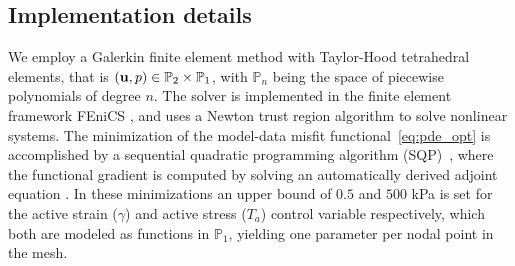\subsection{Implementation details}
We employ a Galerkin finite element method with Taylor-Hood
tetrahedral elements, that is $(\mathbf{u}, p) \in \mathbb{P}_2 \times
\mathbb{P}_1 $, with $\mathbb{P}_n$ being the space of piecewise
polynomials of degree $n$.
The solver is implemented in the finite element framework FEniCS
\cite{logg2012automated}, and uses a Newton trust region algorithm
\cite{PETScPackage} to solve nonlinear systems. The minimization of the
model-data misfit functional~\eqref{eq:pde_opt} is accomplished by a sequential
quadratic programming algorithm (SQP)~\cite{kraft1988software}, where
the functional gradient is computed by solving an automatically derived adjoint
equation \cite{farrell2013automated}. In these minimizations an upper
bound of $0.5$ and $500$ kPa is set for the active strain ($\gamma$)
and active stress ($T_a$) control variable respectively, which both
are modeled as functions in $\mathbb{P}_1$, yielding one parameter per
nodal point in the mesh.

